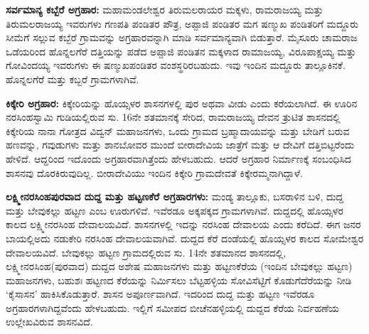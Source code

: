\textbf{ಸರ್ವಮಾನ್ಯ ಕಬ್ಬೆರೆ ಅಗ್ರಹಾರ:} ಮಹಾಮಂಡಲೇಶ್ವರ ತಿರುಮಲರಾಯರ ಮಕ್ಕಳು, ರಾಮರಾಜಯ್ಯ ಮತ್ತು ತಿರುಮಲರಾಜಯ್ಯ ಇವರುಗಳು ಗಣಪತಿ ಪಂಡಿತರ ಪೌತ್ರ, ಅಪ್ಪಾಜಿ ಪಂಡಿತರ ಮಗ ಷಣ್ಮುಖ ಪಂಡಿತರಿಗೆ ಮದ್ದೂರು ಸೀಮೆಗೆ ಸಲ್ಲುವ ಕಬ್ಬೆರೆ ಗ್ರಾಮವನ್ನು ಅಗ್ರಹಾರವನ್ನಾಗಿ ಮಾಡಿ ಸರ್ವಮಾನ್ಯವಾಗಿ ಬಿಡುತ್ತಾರೆ. ಮೈಸೂರು ಚಾಮರಾಜ ಒಡೆಯರಿಂದ ಹೊನ್ನಲಗೆರೆ ದತ್ತಿಯನ್ನು ಪಡೆದ ಅಪ್ಪಾಜಿ ಪಂಡಿತನ ಮಕ್ಕಳಾದ ರಾಮಾಜಯ್ಯ, ವಿರೂಪಾಕ್ಷಯ್ಯ ಮತ್ತು ಗೋವಿಂದಯ್ಯ ಇವರುಗಳು ಈ ಷಣ್ಮುಖಪಂಡಿತರ ವಂಶಸ್ಥರಿರಬಹುದು. ಇವು ಇಂದಿನ ಮದ್ದೂರು ತಾಲ್ಲೂಕಿನ\break ಕೆ. ಹೊನ್ನಲಗೆರೆ ಮತ್ತು ಕಬ್ಬರೆ ಗ್ರಾಮಗಳಾಗಿವೆ.

\textbf{ಕಿಕ್ಕೇರಿ ಅಗ್ರಹಾರ:} ಕಿಕ್ಕೇರಿಯನ್ನು ಹೊಯ್ಸಳರ ಶಾಸನಗಳಲ್ಲಿ ಪುರ ಅಥವಾ ವೀಡು ಎಂದು ಕರೆಯಲಾಗಿದೆ. ಈ ಊರಿನ ನರಸಿಂಹಸ್ವಾಮಿ ಗುಡಿಯಲ್ಲಿರುವ ಸು. 16ನೇ ಶತಮಾನಕ್ಕೆ ಸೇರಿದ, ರಾಮರಾಜಯ್ಯ ದೇವನ ತ್ರುಟಿತ ಶಾಸನದಲ್ಲಿ ಕಿಕ್ಕೇರಿಯ ನಾನಾ ಗೋತ್ರದ ವಿದ್ವನ್​ ಮಹಾಜನಗಳು, ಒಂದು ಗ್ರಾಮದ ಬ್ರಹ್ಮಾದಾಯವನ್ನು ಮತ್ತು ಬೇಡಿಗೆ ಬರುವ ಹಣವನ್ನು, ಗವುಡುಗಳು ಮತ್ತು ಶಾನಬೋವರ ಮುಂದೆ ಬೀರಾದೇವಿಯ ಜಾತ್ರೆಗೆ ಮತ್ತು ಆ ದೇವಿಗೆ ದತ್ತಿಬಿಟ್ಟರೆಂದು ಹೇಳಿದೆ. ಆದ್ದರಿಂದ ಇದೊಂದು ಅಗ್ರಹಾರವಾಗಿತ್ತೆಂದು ಹೇಳಬಹುದು. ಆದರೆ ಅಗ್ರಹಾರ ನಿರ್ಮಾಣಕ್ಕೆ ಸಂಬಂಧಿಸಿದ ಶಾಸನವು ದೊರಕಿರುವುದಿಲ್ಲ. ಬೀರಾದೇವಿಯು ಇಂದಿನ ಕಿಕ್ಕೇರಿ ಗ್ರಾಮದೇವತೆ ಕಿಕ್ಕೇರಮ್ಮನಾಗಿದ್ದಾಳೆ.

\vskip 2pt

\textbf{ಲಕ್ಷ್ಮೀನರಸಿಂಹಪುರವಾದ ದುದ್ದ ಮತ್ತು ಹಟ್ಟಣಕೆರೆ ಅಗ್ರಹಾರಗಳು:} ಮಂಡ್ಯ ತಾಲ್ಲೂಕು, ಬಸರಾಳಿನ ಬಳಿ, ದುದ್ದ ಮತ್ತು ಬೇವುಕಲ್ಲು ಹಟ್ಟಣ ಎಂಬ ಊರುಗಳಿವೆ. ಇವೆರಡೂ ಅಕ್ಕಪಕ್ಕದ ಗ್ರಾಮಗಳಾಗಿವೆ. ದುದ್ದದಲ್ಲಿ ಹೊಯ್ಸಳರ ಕಾಲದ ಲಕ್ಷ್ಮೀನರಸಿಂಹ ದೇವಾಲಯವಿದೆ. ಶಾಸನಗಳಲ್ಲಿ ಇದನ್ನು ನರಸಿಂಹ ದೇವಾಲಯ ಎಂದು ಕರೆದಿದೆ. ಈಗ ಜನರ ಬಾಯಲ್ಲಿ\break ಅದು ನಡುಕೇರಿ ನರಸಿಂಹ ದೇವಾಲಯವಾಗಿವೆ. ದುದ್ದದ ಕೆರೆ ದಂಡೆಯಲ್ಲಿ ಹೊಯ್ಸಳರ ಕಾಲದ ಸೋಮೇಶ್ವರ ದೇವಾಲಯವಿದೆ. ಬೇವುಕಲ್ಲು ಹಟ್ಟಣ ಗ್ರಾಮದಲ್ಲಿರುವ ಸು. 14ನೇ ಶತಮಾನದ ಶಾಸನದಲ್ಲಿ, ಲಕ್ಷ್ಮೀನರಸಿಂಹ(ಪುರವಾದ) ದುದ್ದದ ಅಶೇಷ ಮಹಾಜನಗಳು ಮತ್ತು ಹಟ್ಟಣಕೆರೆಯ (ಇಂದಿನ ಬೇವುಕಲ್ಲು ಹಟ್ಟಣ) ಮಹಾಜನಗಳು, ಬಹುಶಃ ಹಟ್ಟಣದ ಕೆರೆಯನ್ನು ನಿರ್ಮಿಸಲು ಬೆಟ್ಟಹಳ್ಳಿಯ ಸೋವಿಸೆಟ್ಟಿಗೆ ಕೊಡುಗೆದೆರೆಯನ್ನು ನೀಡಿ ‘ಕೈಸಾಸನ’ ಹಾಕಿಸಿಕೊಡುತ್ತಾರೆ. ಶಾಸನ ಅಪೂರ್ಣವಾಗಿದೆ. ಇದರಿಂದ ದುದ್ದ ಮತ್ತು ಹಟ್ಟಣ ಇವೆರಡೂ ಅಗ್ರಹಾರಗಳಾಗಿದ್ದವೆಂದು ಹೇಳಬಹುದು. ಇಲ್ಲಿಗೆ ಸಮೀಪದ ಬೀಚೆನಹಳ್ಳಿಯಲ್ಲಿ ದುದ್ದದ ಕೆರೆಯ ನಿರ್ವಹಣೆಯ ಉಲ್ಲೇಖವಿರುವ ಶಾಸನವಿದೆ.

\vskip 2pt

